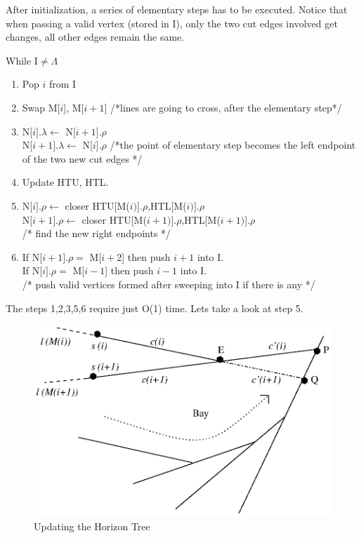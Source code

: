 \documentclass[12pt]{article}
\begin{document}
        After initialization, a series of elementary steps has to be executed.
        Notice that when passing a valid vertex (stored in I), only the two
        cut edges involved get changes, all other edges remain the same.

        \vspace{.2 cm}

        While I$\neq \Lambda$
        \begin{enumerate}
            \item Pop $i$ from I
            \item Swap M[$i$], M[$i+1$] /*lines are going to cross, after the elementary step*/
            \item N[$i].\lambda \leftarrow$ N[$i+1].\rho $ \\
                N[$i+1].\lambda \leftarrow$ N[$i].\rho $ /*the point of elementary step
            becomes the left endpoint of the two new cut edges */ 
            \item Update HTU, HTL.
            \item N[$i].\rho \leftarrow $ closer {HTU[M($i)].\rho$,HTL[M($i)].\rho$} \\
                N[$i+1].\rho \leftarrow$ closer {HTU[M($i+1)].\rho$,HTL[M($i+1)].\rho$} \\
                /* find the new right endpoints */
            \item If N[$i+1].\rho =$ M[$i+2$] then push $i+1$ into I. \\
                If N[$i].\rho =$ M[$i-1$] then push $i-1$ into I. \\
                /* push valid vertices formed after sweeping into I if there is any */
        \end{enumerate}

        The steps 1,2,3,5,6 require just O(1) time. Lets take a look at step 5.


        \begin{figure}
            \center
            \includegraphics[viewport=205 290 401 426]{update_htu.eps}
            \caption{Updating the Horizon Tree}
            \label{figure.update_htu}
        \end{figure}
\end{document}
